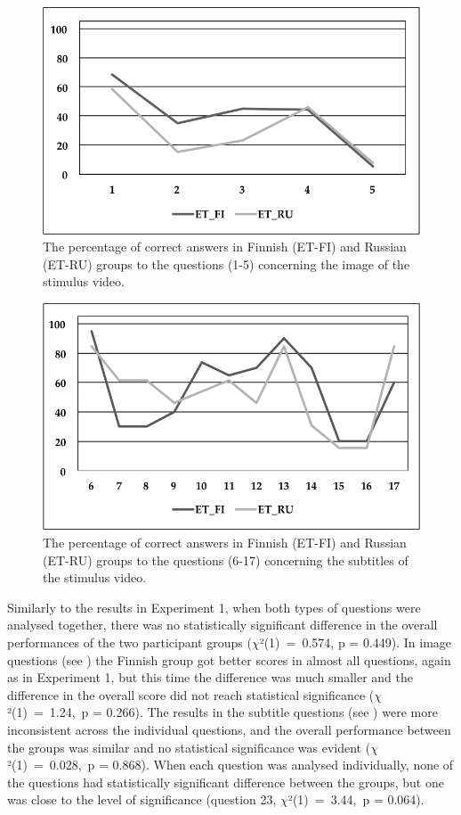 \documentclass[output=paper]{langsci/langscibook}
\begin{document}
\begin{figure}[h]
 \includegraphics[width=\textwidth]{figures/Lang3.png}
 \caption{The percentage of correct answers in Finnish (ET-FI) and Russian (ET-RU) groups to the questions (1-5) concerning the image of the stimulus video.}
 \label{lang:fig:3}
\end{figure} 

\begin{figure}[h]
 \includegraphics[width=\textwidth]{figures/Lang4.png}
 \caption{The percentage of correct answers in Finnish (ET-FI) and Russian (ET-RU) groups to the questions (6-17) concerning the subtitles of the stimulus video.}
 \label{lang:fig:4}
\end{figure} 

Similarly to the results in Experiment 1, when both types of questions were analysed together, there was no statistically significant difference in the overall performances of the two participant groups ($\chi $²(1)~=~0.574, p = 0.449). In image questions (see ) the Finnish group got better scores in almost all questions, again as in Experiment 1, but this time the difference was much smaller and the difference in the overall score did not reach statistical significance ($\chi $²(1)~=~1.24,~p = 0.266). The results in the subtitle questions (see ) were more inconsistent across the individual questions, and the overall performance between the groups was similar and no statistical significance was evident ($\chi $²(1)~=~0.028,~p = 0.868). When each question was analysed individually, none of the questions had statistically significant difference  between the groups, but one was close to the level of significance (question 23, $\chi $²(1)~=~3.44,~p = 0.064).
\end{document}
